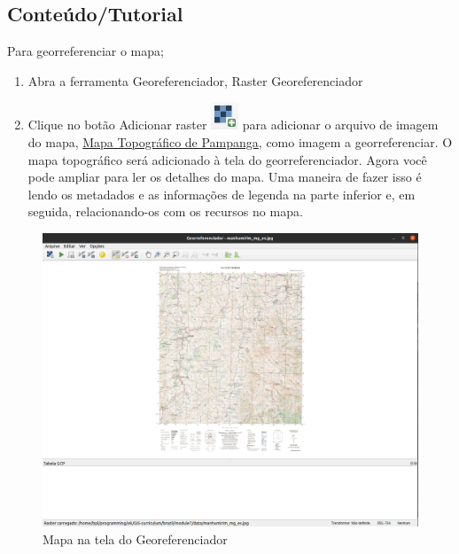 \documentclass[
  portuguese,
]{krantz}
\providecommand{\tightlist}{%
  \setlength{\itemsep}{0pt}\setlength{\parskip}{0pt}}
\begin{document}
\hypertarget{conteuxfadotutorial-6}{%
\subsection{\texorpdfstring{\textbf{Conteúdo/Tutorial}}{Conteúdo/Tutorial}}\label{conteuxfadotutorial-6}}

Para georreferenciar o mapa;

\begin{enumerate}
\def\labelenumi{\arabic{enumi}.}
\tightlist
\item
  Abra a ferramenta Georeferenciador, Raster Georeferenciador
\item
  Clique no botão Adicionar raster \includegraphics{media/modulo7/add-raster.png} para adicionar o arquivo de imagem do mapa, \href{media/modulo7/manhumirim_mg_es.jpeg}{Mapa Topográfico de Pampanga}, como imagem a georreferenciar. O mapa topográfico será adicionado à tela do georreferenciador. Agora você pode ampliar para ler os detalhes do mapa. Uma maneira de fazer isso é lendo os metadados e as informações de legenda na parte inferior e, em seguida, relacionando-os com os recursos no mapa.
\end{enumerate}

\begin{figure}
\centering
\includegraphics{media/modulo7/georeferencer.png}
\caption{Mapa na tela do Georeferenciador}
\end{figure}
\end{document}
